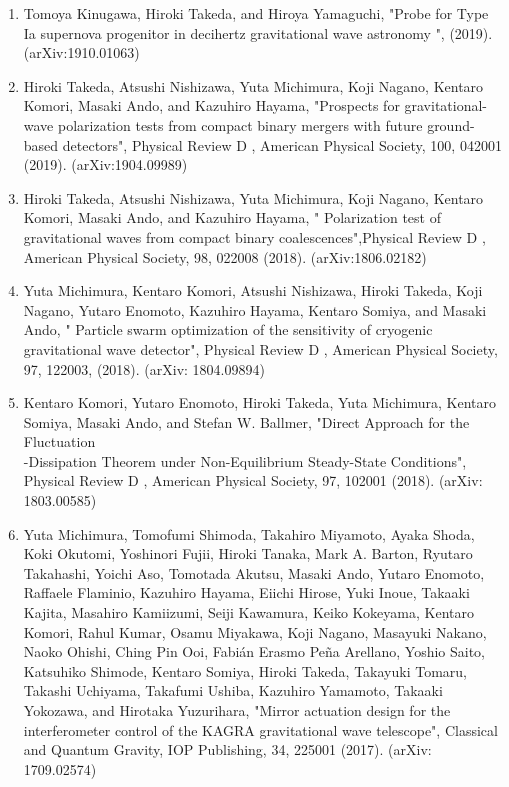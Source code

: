 \documentclass[12pt,a4paper]{article}
\begin{document}
\begin{enumerate}
\item Tomoya Kinugawa, Hiroki Takeda, and Hiroya Yamaguchi, "Probe for Type Ia supernova progenitor in decihertz gravitational wave astronomy ", (2019).\\ (arXiv:1910.01063)
\item Hiroki Takeda, Atsushi Nishizawa, Yuta Michimura, Koji Nagano, Kentaro Komori, Masaki Ando, and Kazuhiro Hayama, "Prospects for gravitational-wave polarization tests from compact binary mergers with future ground-based detectors", Physical Review D , American Physical Society, 100, 042001 (2019). (arXiv:1904.09989)
\item Hiroki Takeda, Atsushi Nishizawa, Yuta Michimura, Koji Nagano, Kentaro Komori, Masaki Ando, and Kazuhiro Hayama, " Polarization test of gravitational waves from compact binary coalescences",Physical Review D , American Physical Society, 98, 022008 (2018). (arXiv:1806.02182)
\item Yuta Michimura, Kentaro Komori, Atsushi Nishizawa, Hiroki Takeda, Koji Nagano, Yutaro Enomoto, Kazuhiro Hayama, Kentaro Somiya, and Masaki Ando, " Particle swarm optimization of the sensitivity of cryogenic gravitational wave detector", Physical Review D , American Physical Society, 97, 122003, (2018). (arXiv: 1804.09894)
\item Kentaro Komori, Yutaro Enomoto, Hiroki Takeda, Yuta Michimura, Kentaro Somiya, Masaki Ando, and Stefan W. Ballmer, "Direct Approach for the Fluctuation\\-Dissipation Theorem under Non-Equilibrium Steady-State Conditions", Physical Review D , American Physical Society, 97, 102001 (2018). (arXiv: 1803.00585)
\item Yuta Michimura, Tomofumi Shimoda, Takahiro Miyamoto, Ayaka Shoda, Koki Okutomi, Yoshinori Fujii, Hiroki Tanaka, Mark A. Barton, Ryutaro Takahashi, Yoichi Aso, Tomotada Akutsu, Masaki Ando, Yutaro Enomoto, Raffaele Flaminio, Kazuhiro Hayama, Eiichi Hirose, Yuki Inoue, Takaaki Kajita, Masahiro Kamiizumi, Seiji Kawamura, Keiko Kokeyama, Kentaro Komori, Rahul Kumar, Osamu Miyakawa, Koji Nagano, Masayuki Nakano, Naoko Ohishi, Ching Pin Ooi, Fabián Erasmo Peña Arellano, Yoshio Saito, Katsuhiko Shimode, Kentaro Somiya, Hiroki Takeda, Takayuki Tomaru, Takashi Uchiyama, Takafumi Ushiba, Kazuhiro Yamamoto, Takaaki Yokozawa, and Hirotaka Yuzurihara, "Mirror actuation design for the interferometer control of the KAGRA gravitational wave telescope", Classical and Quantum Gravity, IOP Publishing, 34, 225001 (2017). (arXiv: 1709.02574)
\end{enumerate}
\end{document}
